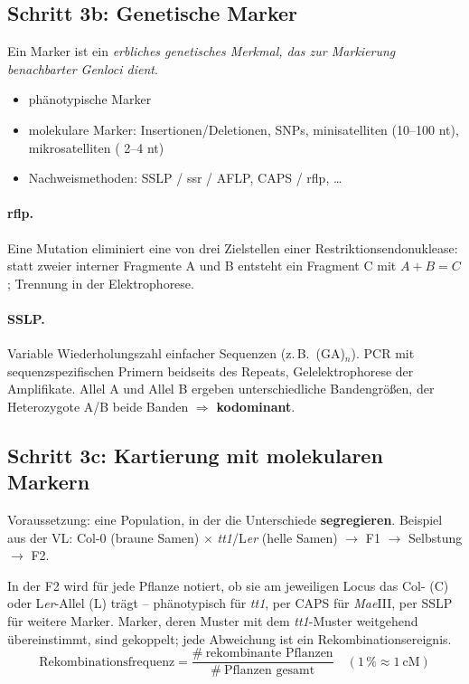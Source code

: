 \subsection*{Schritt 3b: Genetische Marker}\label{subsec:schritt-3b:-genetische-marker}
Ein Marker ist ein \emph{erbliches genetisches Merkmal, das zur Markierung benachbarter Genloci dient}.
\begin{itemize}
    \item phänotypische Marker
    \item molekulare Marker: Insertionen/Deletionen, SNPs, \gls{minisatellit}en (10--100 nt), \gls{mikrosatellit}en (
    2--4 nt)
    \item Nachweismethoden: SSLP / \gls{ssr} / AFLP, CAPS / \gls{rflp}, \ldots
\end{itemize}

\paragraph{\gls{rflp}.} Eine Mutation eliminiert eine von drei Zielstellen einer Restriktionsendonuklease: statt zweier interner Fragmente A und B entsteht ein Fragment C mit $A+B=C$; Trennung in der Elektrophorese.

\paragraph{SSLP.} Variable Wiederholungszahl einfacher Sequenzen (z.\,B.\ (GA)$_n$). PCR mit sequenzspezifischen Primern beidseits des Repeats, Gelelektrophorese der Amplifikate.
Allel A und Allel B ergeben unterschiedliche Bandengrö{\ss}en, der Heterozygote A/B beide Banden $\Rightarrow$ \textbf{kodominant}.


\subsection*{Schritt 3c: Kartierung mit molekularen Markern}\label{subsec:schritt-3c:-kartierung-mit-molekularen-markern}
Voraussetzung: eine Population, in der die Unterschiede \textbf{segregieren}.
Beispiel aus der VL: Col-0 (braune Samen) $\times$ \emph{tt1}/L\emph{er} (helle Samen) $\to$ F1 $\to$ Selbstung $\to$ F2.

In der F2 wird für jede Pflanze notiert, ob sie am jeweiligen Locus das Col- (C) oder L\emph{er}-Allel (L) trägt -- phänotypisch für \emph{tt1}, per CAPS für \emph{Mae}III, per SSLP für weitere Marker.
Marker, deren Muster mit dem \emph{tt1}-Muster weitgehend übereinstimmt, sind gekoppelt; jede Abweichung ist ein Rekombinationsereignis.
\[
    \text{Rekombinationsfrequenz} = \frac{\#\ \text{rekombinante Pflanzen}}{\#\ \text{Pflanzen gesamt}}\quad (1\,\% \approx 1\ \text{cM})
\]

